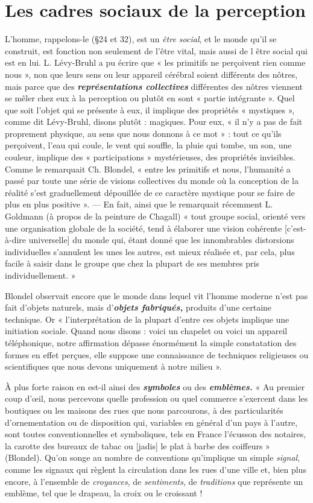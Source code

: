 \section{Les cadres sociaux de la perception}%
L'homme, rappelons-le
(\S 24 et 32), est un {\it être social}, et le monde qu’il se construit,
est fonction non seulement de l’être vital, mais aussi de l être social
qui est en lui. L. Lévy-Bruhl a pu écrire que « les primitifs ne perçoivent
rien comme nous », non que leurs sens ou leur appareil cérébral
soient différents des nôtres, mais parce que des \textbf{\textit {représentations
collectives}} différentes des nôtres viennent se mêler chez eux à la
perception ou plutôt en sont « partie intégrante ». Quel que soit
l'objet qui se présente à eux, il implique des propriétés « mystiques »,
comme dit Lévy-Bruhl, disons plutôt : magiques. Pour eux, « il
n’y a pas de fait proprement physique, au sens que nous donnons à
ce mot » : tout ce qu’ils perçoivent, l'eau qui coule, le vent qui souffle,
la pluie qui tombe, un son, une couleur, implique des « participations »
mystérieuses, des propriétés invisibles. Comme le remarquait
Ch. Blondel, « entre les primitifs et nous, l'humanité a passé par
toute une série de visions collectives du monde où la conception de
la réalité s’est graduellement dépouillée de ce caractère mystique
pour se faire de plus en plus positive ». — En fait, ainsi que le remarquait
récemment L. Goldmann (à propos de la peinture de Chagall)
« tout groupe social, orienté vers une organisation globale de la société,
tend à élaborer une vision cohérente [c’est-à-dire universelle] du
monde qui, étant donné que les innombrables distorsions individuelles
s’annulent les unes les autres, est mieux réalisée et, par cela, plus facile
à saisir dans le groupe que chez la plupart de ses membres pris individuellement. »

Blondel observait encore que le monde dans lequel vit l’homme
moderne n’est pas fait d'objets naturels, mais d'\textbf{\textit {objets fabriqués,}}
produits d’une certaine technique. Or « l'interprétation de la plupart
d’entre ces objets implique une initiation sociale. Quand nous
disons : voici un chapelet ou voici un appareil téléphonique, notre
affirmation dépasse énormément la simple constatation des formes
en effet perçues, elle suppose une connaissance de techniques religieuses
ou scientifiques que nous devons uniquement à notre milieu ».

À plus forte raison en est-il ainsi des \textbf{\textit {symboles}} ou des \textbf{\textit {emblèmes.}}
« Au premier coup d'œil, nous percevons quelle profession ou quel
commerce s’exercent dans les boutiques ou les maisons des rues que
nous parcourons, à des particularités d’ornementation ou de disposition
qui, variables en général d’un pays à l’autre, sont toutes
conventionnelles et symboliques, tels en France l’écusson des notaires,
la carotte des bureaux de tabac ou [jadis] le plat à barbe des coiffeurs »
(Blondel). Qu'on songe au nombre de conventions qu’implique un
simple {\it signal}, comme les signaux qui règlent la circulation dans les
rues d’une ville et, bien plus encore, à l’ensemble de {\it croyances}, de {\it sentiments},
de {\it traditions} que représente un emblème, tel que le drapeau,
la croix ou le croissant !

